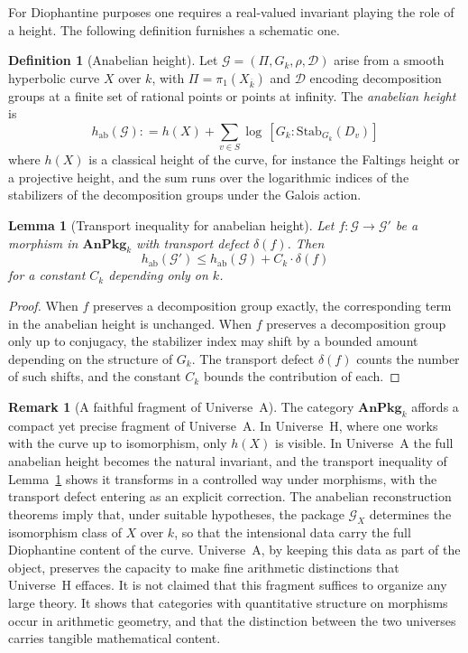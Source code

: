\documentclass[10pt, reqno]{amsart}
\theoremstyle{plain}
\newtheorem{lemma}[theorem]{Lemma}
\theoremstyle{definition}
\newtheorem{definition}[theorem]{Definition}
\newtheorem{remark}[theorem]{Remark}
\theoremstyle{plain}
\newcommand{\coloneqq}{\mathrel{\mathop:}=}
\begin{document}
For Diophantine purposes one requires a real-valued invariant playing the role of a height. The following definition furnishes a schematic one.

\begin{definition}[Anabelian height]\label{def:AnabelianHeight}
Let $\mathcal{G} = (\Pi, G_k, \rho, \mathcal{D})$ arise from a smooth hyperbolic curve $X$ over $k$, with $\Pi = \pi_1(X_{\overline{k}})$ and $\mathcal{D}$ encoding decomposition groups at a finite set of rational points or points at infinity. The \emph{anabelian height} is
\[
  h_{\mathrm{ab}}(\mathcal{G}) \coloneqq h(X) + \sum_{v \in S} \log\, [G_k : \mathrm{Stab}_{G_k}(D_v)]
\]
where $h(X)$ is a classical height of the curve, for instance the Faltings height or a projective height, and the sum runs over the logarithmic indices of the stabilizers of the decomposition groups under the Galois action.
\end{definition}

\begin{lemma}[Transport inequality for anabelian height]\label{lem:TransportAnabelian}
Let $f \colon \mathcal{G} \to \mathcal{G}'$ be a morphism in $\mathbf{AnPkg}_k$ with transport defect $\delta(f)$. Then
\[
  h_{\mathrm{ab}}(\mathcal{G}') \le h_{\mathrm{ab}}(\mathcal{G}) + C_k \cdot \delta(f)
\]
for a constant $C_k$ depending only on $k$.
\end{lemma}

\begin{proof}
When $f$ preserves a decomposition group exactly, the corresponding term in the anabelian height is unchanged. When $f$ preserves a decomposition group only up to conjugacy, the stabilizer index may shift by a bounded amount depending on the structure of $G_k$. The transport defect $\delta(f)$ counts the number of such shifts, and the constant $C_k$ bounds the contribution of each.
\end{proof}

\begin{remark}[A faithful fragment of Universe~A]\label{rem:AnabelianFragment}
The category $\mathbf{AnPkg}_k$ affords a compact yet precise fragment of Universe~A. In Universe~H, where one works with the curve up to isomorphism, only $h(X)$ is visible. In Universe~A the full anabelian height becomes the natural invariant, and the transport inequality of Lemma~\ref{lem:TransportAnabelian} shows it transforms in a controlled way under morphisms, with the transport defect entering as an explicit correction. The anabelian reconstruction theorems imply that, under suitable hypotheses, the package $\mathcal{G}_X$ determines the isomorphism class of $X$ over $k$, so that the intensional data carry the full Diophantine content of the curve. Universe~A, by keeping this data as part of the object, preserves the capacity to make fine arithmetic distinctions that Universe~H effaces. It is not claimed that this fragment suffices to organize any large theory. It shows that categories with quantitative structure on morphisms occur in arithmetic geometry, and that the distinction between the two universes carries tangible mathematical content.
\end{remark}
\end{document}
